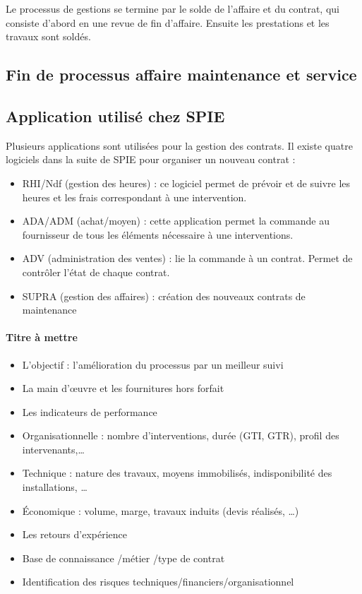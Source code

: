Le processus de gestions se termine par le solde de l’affaire et du contrat, qui consiste d’abord en une revue de fin d’affaire. Ensuite les prestations et les travaux sont soldés.

\subsection{Fin de processus affaire maintenance et service}

\subsection{Application utilisé chez SPIE}

Plusieurs applications sont utilisées pour la gestion des contrats. Il existe quatre logiciels dans la suite de SPIE pour organiser un nouveau contrat :

\begin{itemize}
\item RHI/Ndf (gestion des heures) : ce logiciel permet de prévoir et de suivre les heures et les frais correspondant à une intervention.
\item ADA/ADM (achat/moyen) : cette application permet la commande au fournisseur de tous les éléments nécessaire à une interventions.
\item ADV (administration des ventes) : lie la commande à un contrat. Permet de contrôler l’état de chaque contrat.
\item SUPRA (gestion des affaires) : création des nouveaux contrats de maintenance
\end{itemize}

\paragraph{Titre à mettre}

\begin{itemize}
\item L’objectif : l’amélioration du processus par un meilleur suivi
\item La main d’œuvre et les fournitures hors forfait
\item Les indicateurs de performance 
\item Organisationnelle : nombre d’interventions, durée (GTI, GTR), profil des intervenants,…
\item Technique : nature des travaux, moyens immobilisés, indisponibilité des installations,  …
\item Économique : volume, marge, travaux induits (devis réalisés, …)
\item Les retours d’expérience
\item Base de connaissance /métier /type de contrat
\item Identification des risques techniques/financiers/organisationnel
\end{itemize}

